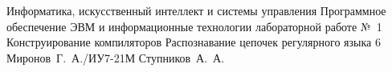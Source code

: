 \documentclass{bmstu}
\begin{document}
\makereporttitle
    {Информатика, искусственный интеллект и системы управления}
    {Программное обеспечение ЭВМ и информационные технологии}
    {лабораторной работе №~1}
    {Конструирование компиляторов}
    {Распознавание цепочек регулярного языка}
    {6}
    {Миронов~Г.~А./ИУ7-21М}
    {Ступников~А.~А.}






\end{document}
